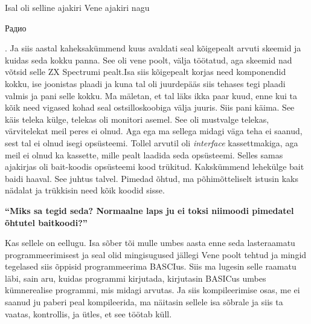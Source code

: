 Isal  oli selline ajakiri Vene ajakiri nagu \begin{russian}Радио\end{russian}. Ja siis aastal kaheksakümmend kuus  avaldati seal kõigepealt arvuti skeemid ja kuidas seda kokku panna. See oli vene poolt, välja töötatud, aga skeemid nad võtsid selle ZX Spectrumi pealt.Isa siis kõigepealt korjas need komponendid kokku, ise joonistas plaadi ja kuna tal oli juurdepääs siis tehases tegi plaadi valmis ja pani selle kokku. Ma mäletan, et tal läks ikka paar kuud, enne kui ta kõik need vigased kohad seal ostsilloskoobiga välja juuris. Siis pani käima. See käis teleka  külge,  telekas oli monitori asemel. See oli mustvalge telekas, värvitelekat  meil peres ei olnud.  Aga ega ma sellega  midagi väga teha ei saanud, sest tal ei olnud isegi opsüsteemi. Tollel arvutil oli \emph{interface} kassettmakiga, aga meil ei olnud ka kassette, mille pealt laadida seda opsüsteemi. Selles samas ajakirjas oli bait-koodis opsüsteemi kood trükitud. Kakskümmend lehekülge bait baidi haaval. See juhtus talvel. Pimedad õhtud, ma põhimõtteliselt istusin kaks nädalat ja trükkisin need kõik koodid sisse.

\textbf{\enquote{Miks sa tegid seda? Normaalne laps ju ei toksi niimoodi pimedatel õhtutel baitkoodi?}}

Kas sellele on eellugu. Isa sõber tõi mulle umbes aasta enne seda lasteraamatu  programmeerimisest ja seal olid mingisugused jällegi Vene poolt tehtud ja mingid tegelased siis õppisid programmeerima BASCIus. Siis ma lugesin selle raamatu läbi, sain aru, kuidas programmi kirjutada, kirjutasin BASICus umbes kümnerealise programmi, mis midagi arvutas. Ja siis kompileerimise osas, me ei saanud ju paberi peal kompileerida, ma näitasin sellele isa sõbrale ja siis ta vaatas, kontrollis,  ja ütles, et see töötab küll.

